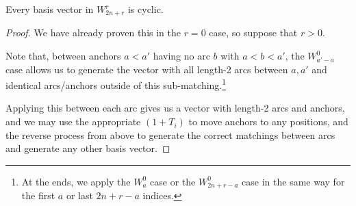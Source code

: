 \documentclass{amsart}
\begin{document}
\begin{lemma}
  Every basis vector in $W_{2n + r}^r$ is cyclic.
\end{lemma}
\begin{proof}
  We have already proven this in the $r = 0$ case, so suppose that $r > 0$.

    Note that, between anchors $a<a'$ having no arc $b$ with $a < b < a'$, the $W_{a'-a}^0$ case allows us to generate the vector with all length-2 arcs between $a,a'$ and identical arcs/anchors outside of this sub-matching.\footnote{At the ends, we apply the $W_a^0$ case or the $W_{2n + r - a}^{0}$ case in the same way for the first $a$ or last $2n + r - a$ indices.}

  Applying this between each arc gives us a vector with length-2 arcs and anchors, and we may use the appropriate $(1+T_i)$ to move anchors to any positions, and the reverse process from above to generate the correct matchings between arcs and generate any other basis vector.
\end{proof}
\end{document}
